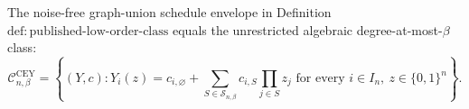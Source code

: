 The noise-free graph-union schedule envelope in Definition~\(\mathrm{def{:}published\text{-}low\text{-}order\text{-}class}\) equals the unrestricted algebraic degree-at-most-\(\beta\) class:
\[
\mathcal C^{\mathrm{CEY}}_{n,\beta}
=\left\{(Y,c):Y_i(z)=c_{i,\varnothing}+
\sum_{S\in\mathcal S_{n,\beta}}c_{i,S}\prod_{j\in S}z_j
\text{ for every }i\in I_n,\ z\in\{0,1\}^n\right\}.
\]